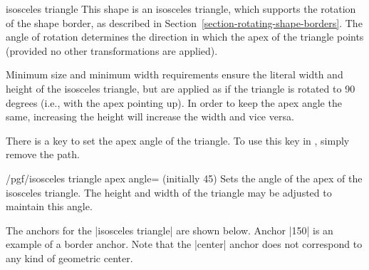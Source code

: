 \begin{shape}{isosceles triangle}
	This shape is an isosceles triangle, which supports the rotation of 
	the shape border, as described in 
	Section~\ref{section-rotating-shape-borders}. The angle of rotation
	determines the direction in which the apex of the triangle points
	(provided no other transformations are applied).
	
	Minimum size and minimum width requirements ensure the literal width 
	and height of the isosceles triangle, but are applied as if the 
	triangle is rotated to 90 degrees (i.e., with the apex pointing up). 
	In order to keep the apex angle the same, increasing the height will 
	increase the width and vice versa. 
   
\begin{codeexample}[]
\end{codeexample}	

	There is a \pgfname{} key to set the apex angle of the
	triangle. 
	To use this key in \tikzname, simply remove the  
	path.
    
  \begin{key}{/pgf/isosceles triangle apex angle= (initially 45)}
    Sets the angle of the apex of the isosceles triangle. The height
    and width of the triangle may be adjusted to maintain this
    angle.
  \end{key}
  
   The anchors for the |isosceles triangle| are shown below.
   Anchor |150| is an
	example of a border anchor. Note that the |center| anchor does not
	correspond to any kind of geometric center.
	
\begin{codeexample}[]
\Huge
{}
\end{codeexample} 
\end{shape}


